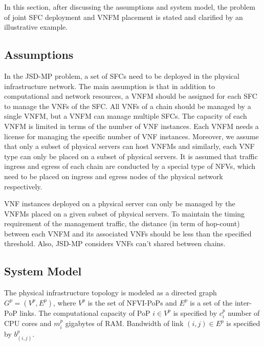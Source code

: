 In this section, after discussing the assumptions and system model, the problem of joint SFC deployment and VNFM placement is stated and clarified by an illustrative example.

\subsection{Assumptions}\label{subsec:assumptions}
In the JSD-MP problem, a set of SFCs need to be deployed in the physical infrastructure network.
The main assumption is that in addition to computational and network resources,
a VNFM should be assigned for each SFC to manage the VNFs of the SFC.
All VNFs of a chain should be managed by a single VNFM, but a VNFM can manage multiple SFCs.
The capacity of each VNFM is limited in terms of the number of VNF instances.
Each VNFM needs a license for managing the specific number of VNF instances.
Moreover, we assume that only a subset of physical servers can host VNFMs and similarly,
each VNF type can only be placed on a subset of physical servers. It is assumed that traffic ingress and egress of each chain are conducted by a special type of NFVs, which need to be placed on ingress and egress nodes  of the physical network respectively.

VNF instances deployed on a physical server can only be managed by the VNFMs placed on a given subset of physical servers. To maintain the timing requirement of the management traffic, the distance (in term of hop-count) between each VNFM and its associated VNFs should be less than the specified threshold.
Also, JSD-MP considers VNFs can't shared between chains.

\subsection{System Model}\label{subsec:sysmodel}
%
%

The physical infrastructure topology is modeled as a directed graph \(G^p=(V^p, E^p)\),
where \(V^p\) is the set of NFVI-PoPs and \(E^p\) is a set of the inter-PoP links.
The computational capacity of PoP \(i \in V^p\) is specified by \(c^p_i\) number of CPU cores and \(m^p_i\) gigabytes of RAM.
Bandwidth of link \((i,j) \in E^p\) is specified by \(b^p_{(i,j)}\).

